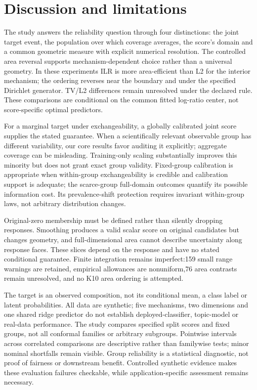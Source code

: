 \section{Discussion and limitations}
\label{sec:scope}
The study answers the reliability question through four distinctions: the joint target event, the population over which coverage averages, the score's domain and a common geometric measure with explicit numerical resolution. The controlled area reversal supports mechanism-dependent choice rather than a universal geometry. In these experiments ILR is more area-efficient than L2 for the interior mechanism; the ordering reverses near the boundary and under the specified Dirichlet generator. TV/L2 differences remain unresolved under the declared rule. These comparisons are conditional on the common fitted log-ratio center, not score-specific optimal predictors.

For a marginal target under exchangeability, a globally calibrated joint score supplies the stated guarantee. When a scientifically relevant observable group has different variability, our core results favor auditing it explicitly; aggregate coverage can be misleading. Training-only scaling substantially improves this minority but does not grant exact group validity. Fixed-group calibration is appropriate when within-group exchangeability is credible and calibration support is adequate; the scarce-group full-domain outcomes quantify its possible information cost. Its prevalence-shift protection requires invariant within-group laws, not arbitrary distribution changes.

Original-zero membership must be defined rather than silently dropping responses. Smoothing produces a valid scalar score on original candidates but changes geometry, and full-dimensional area cannot describe uncertainty along response faces. These slices depend on the response and have no stated conditional guarantee. Finite integration remains imperfect:159 small range warnings are retained, empirical allowances are nonuniform,76 area contrasts remain unresolved, and no K10 area ordering is attempted.

The target is an observed composition, not its conditional mean, a class label or latent probabilities. All data are synthetic; five mechanisms, two dimensions and one shared ridge predictor do not establish deployed-classifier, topic-model or real-data performance. The study compares specified split scores and fixed groups, not all conformal families or arbitrary subgroups. Pointwise intervals across correlated comparisons are descriptive rather than familywise tests; minor nominal shortfalls remain visible. Group reliability is a statistical diagnostic, not proof of fairness or downstream benefit. Controlled synthetic evidence makes these evaluation failures checkable, while application-specific assessment remains necessary.
